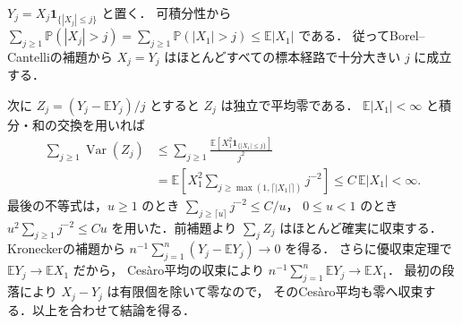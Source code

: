 \documentclass[a5paper,10pt,onecolumn]{jsarticle}
\makeatletter
\theoremstyle{mathnotetheorem}
\renewcommand{\proofname}{証明}
\renewenvironment{proof}[1][\proofname]{%
  \par\pushQED{\qed}\normalfont\topsep4\p@\@plus2\p@\relax
  \trivlist\item[\hskip\labelsep\bfseries #1]\ignorespaces
}{\popQED\endtrivlist\@endpefalse}
\makeatother
\begin{document}
\begin{proof}
$Y_j=X_j\mathbf1_{\{|X_j|\le j\}}$ と置く．
可積分性から
$\sum_{j\ge1}\mathbb P(|X_j|>j)
=\sum_{j\ge1}\mathbb P(|X_1|>j)\le\mathbb E|X_1|$ である．
従ってBorel--Cantelliの補題から
$X_j=Y_j$ はほとんどすべての標本経路で十分大きい $j$ に成立する．

次に $Z_j=(Y_j-\mathbb E Y_j)/j$ とすると $Z_j$ は独立で平均零である．
$\mathbb E|X_1|<\infty$ と積分・和の交換を用いれば
\[
 \begin{aligned}
 \sum_{j\ge1}\operatorname{Var}(Z_j)
 &\le\sum_{j\ge1}\frac{\mathbb E[X_1^2
 \mathbf1_{\{|X_1|\le j\}}]}{j^2}\\
 &=\mathbb E\left[X_1^2
 \sum_{j\ge\max(1,\lceil|X_1|\rceil)}j^{-2}\right]
 \le C\,\mathbb E|X_1|<\infty.
 \end{aligned}
\]
最後の不等式は，$u\ge1$ のとき
$\sum_{j\ge\lceil u\rceil}j^{-2}\le C/u$，
$0\le u<1$ のとき $u^2\sum_{j\ge1}j^{-2}\le Cu$
を用いた．前補題より $\sum_j Z_j$ はほとんど確実に収束する．
Kroneckerの補題から
$n^{-1}\sum_{j=1}^n(Y_j-\mathbb E Y_j)\to0$ を得る．
さらに優収束定理で $\mathbb E Y_j\to\mathbb E X_1$ だから，
Ces\`aro平均の収束により
$n^{-1}\sum_{j=1}^n\mathbb E Y_j\to\mathbb E X_1$．
最初の段落により $X_j-Y_j$ は有限個を除いて零なので，
そのCes\`aro平均も零へ収束する．以上を合わせて結論を得る．
\end{proof}
\end{document}
